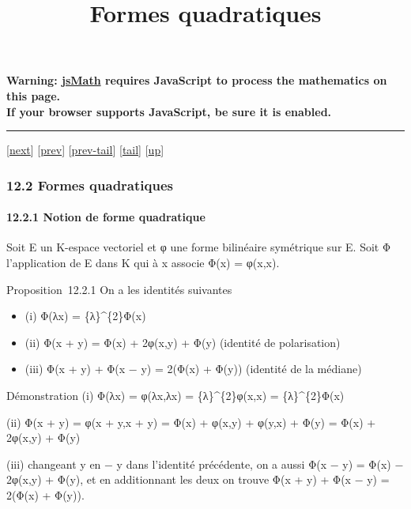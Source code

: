 \documentclass[]{article}
\title{Formes quadratiques}
\author{}
\date{}
\begin{document}
\maketitle

\textbf{Warning: \href{http://www.math.union.edu/locate/jsMath}{jsMath}
requires JavaScript to process the mathematics on this page.\\ If your
browser supports JavaScript, be sure it is enabled.}

\begin{center}\rule{3in}{0.4pt}\end{center}

{[}\href{coursse69.html}{next}{]} {[}\href{coursse67.html}{prev}{]}
{[}\href{coursse67.html\#tailcoursse67.html}{prev-tail}{]}
{[}\hyperref[tailcoursse68.html]{tail}{]}
{[}\href{coursch13.html\#coursse68.html}{up}{]}

\subsubsection{12.2 Formes quadratiques}

\paragraph{12.2.1 Notion de forme quadratique}

Soit E un K-espace vectoriel et φ une forme bilinéaire symétrique sur E.
Soit Φ l'application de E dans K qui à x associe Φ(x) = φ(x,x).

Proposition~12.2.1 On a les identités suivantes

\begin{itemize}
\itemsep1pt\parskip0pt
\item
  (i) Φ(λx) = \{λ\}\^{}\{2\}Φ(x)
\item
  (ii) Φ(x + y) = Φ(x) + 2φ(x,y) + Φ(y) (identité de polarisation)
\item
  (iii) Φ(x + y) + Φ(x − y) = 2(Φ(x) + Φ(y)) (identité de la médiane)
\end{itemize}

Démonstration (i) Φ(λx) = φ(λx,λx) = \{λ\}\^{}\{2\}φ(x,x) =
\{λ\}\^{}\{2\}Φ(x)

(ii) Φ(x + y) = φ(x + y,x + y) = Φ(x) + φ(x,y) + φ(y,x) + Φ(y) = Φ(x) +
2φ(x,y) + Φ(y)

(iii) changeant y en − y dans l'identité précédente, on a aussi Φ(x − y)
= Φ(x) − 2φ(x,y) + Φ(y), et en additionnant les deux on trouve Φ(x + y)
+ Φ(x − y) = 2(Φ(x) + Φ(y)).
\end{document}
